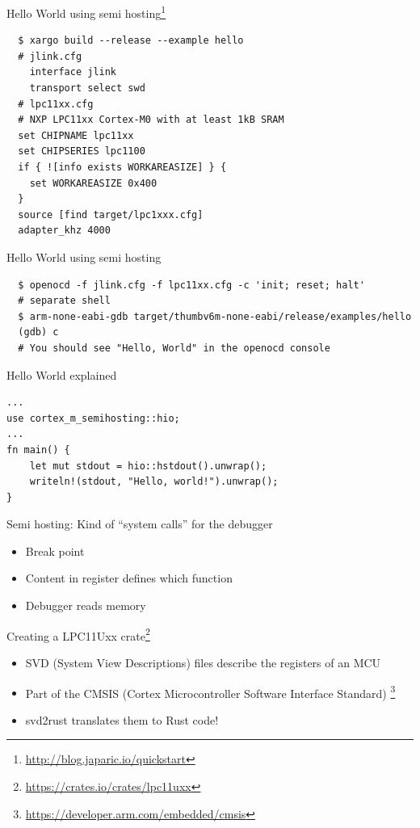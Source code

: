 \documentclass[aspectratio=1610,14pt,t]{beamer}
\begin{document}
\begin{frame}[c,fragile]{Hello World using semi hosting\footnote{\url{http://blog.japaric.io/quickstart}}}
  \begin{verbatim}
  $ xargo build --release --example hello
  # jlink.cfg
    interface jlink
    transport select swd
  # lpc11xx.cfg
  # NXP LPC11xx Cortex-M0 with at least 1kB SRAM
  set CHIPNAME lpc11xx
  set CHIPSERIES lpc1100
  if { ![info exists WORKAREASIZE] } {
    set WORKAREASIZE 0x400
  }
  source [find target/lpc1xxx.cfg]
  adapter_khz 4000
  \end{verbatim}
\end{frame}

\begin{frame}[c,fragile]{Hello World using semi hosting}
  \begin{verbatim}
  $ openocd -f jlink.cfg -f lpc11xx.cfg -c 'init; reset; halt'
  # separate shell
  $ arm-none-eabi-gdb target/thumbv6m-none-eabi/release/examples/hello
  (gdb) c
  # You should see "Hello, World" in the openocd console
  \end{verbatim}
\end{frame}

\begin{frame}[c,fragile]{Hello World explained}
  \begin{verbatim}
...
use cortex_m_semihosting::hio;
...
fn main() {
    let mut stdout = hio::hstdout().unwrap();
    writeln!(stdout, "Hello, world!").unwrap();
}
  \end{verbatim}
\pause Semi hosting: Kind of ``system calls'' for the debugger
  \begin{itemize}
    \item Break point
    \item Content in register defines which function
    \item Debugger reads memory
  \end{itemize}
\end{frame}

\begin{frame}[c,fragile]{Creating a LPC11Uxx crate\footnote{\url{https://crates.io/crates/lpc11uxx}}}
  \begin{itemize}
    \item SVD (System View Descriptions) files describe the registers of an MCU
    \item Part of the CMSIS (Cortex Microcontroller Software Interface Standard)
      \footnote{\url{https://developer.arm.com/embedded/cmsis}}
    \item svd2rust translates them to Rust code!
  \end{itemize}
\end{frame}
\end{document}
